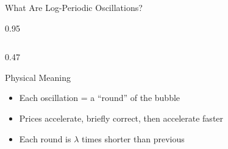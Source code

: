 \documentclass[9pt, aspectratio=169, t]{beamer}
\begin{document}
\begin{frame}{What Are Log-Periodic Oscillations?}
\begin{cminipage}{0.95\textwidth}
{\begin{columns}[T]
\begin{column}{0.47\textwidth}
            \begin{block}{Physical Meaning}
                \begin{itemize}\setlength{\itemsep}{0pt}
                    \item Each oscillation = a ``round'' of the bubble
                    \item Prices accelerate, briefly correct, then accelerate faster
                    \item Each round is $\lambda$ times shorter than previous
                \end{itemize}
            \end{block}
        \end{column}
    \end{columns}
    }
    \end{cminipage}
\end{frame}
\end{document}
